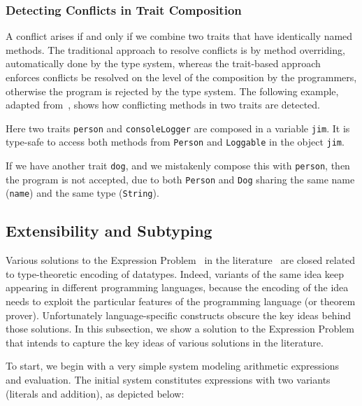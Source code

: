 \subsubsection{Detecting Conflicts in Trait Composition}

A conflict arises if and only if we combine two traits that have identically
named methods. The traditional approach to resolve conflicts is by method
overriding, automatically done by the type system, whereas the trait-based
approach enforces conflicts be resolved on the level of the composition by the
programmers, otherwise the program is rejected by the type system. The following
example, adapted from~\citet{alpuimdisjoint}, shows how conflicting methods in
two traits are detected.


Here two traits \lstinline{person} and \lstinline{consoleLogger} are composed in
a variable \lstinline{jim}. It is type-safe to access both methods from
\lstinline{Person} and \lstinline{Loggable} in the object \lstinline{jim}.

If we have another trait \lstinline{dog}, and we mistakenly compose this with
\lstinline$person$, then the program is not accepted, due to both
\lstinline{Person} and \lstinline{Dog} sharing the same name (\lstinline{name})
and the same type (\lstinline$String$).



\subsection{Extensibility and Subtyping}

Various solutions to the Expression Problem~\cite{wadler1998expression} in the
literature~\cite{finally-tagless,oliveira09modular,DelawareOS13,oliveira2012extensibility,
  swierstra:la-carte} are closed related to type-theoretic encoding of
datatypes. Indeed, variants of the same idea keep appearing in different
programming languages, because the encoding of the idea needs to exploit the
particular features of the programming language (or theorem prover).
Unfortunately language-specific constructs obscure the key ideas behind those
solutions. In this subsection, we show a solution to the Expression Problem that
intends to capture the key ideas of various solutions in the literature.

To start, we begin with a very simple system modeling arithmetic expressions and
evaluation. The initial system constitutes expressions with two variants
(literals and addition), as depicted below:

